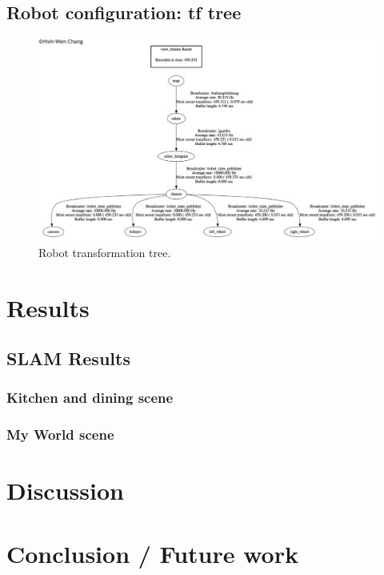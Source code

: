 \documentclass[10pt,journal,compsoc]{IEEEtran}
\begin{document}
\subsection{Robot configuration: tf tree}
\begin{figure}[thpb]
      \centering
      \includegraphics[width=\linewidth]{tfTree.png}
      \caption{Robot transformation tree.}
      \label{fig:robot1}
\end{figure}
\section{Results}

\subsection{SLAM Results}
\subsubsection{Kitchen and dining scene}

\subsubsection{My World scene}

\section{Discussion}


\section{Conclusion / Future work}
\end{document}
